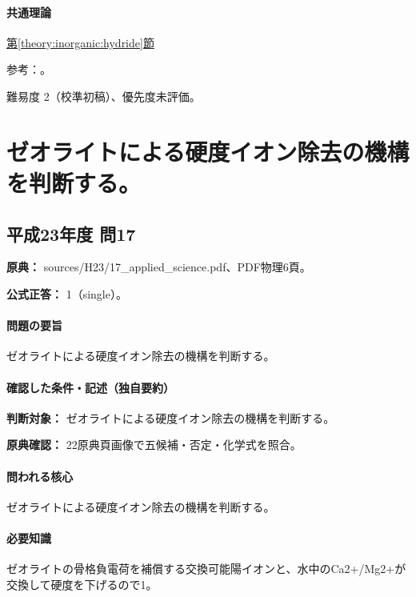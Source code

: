 \paragraph{共通理論} \hyperref[theory:inorganic:hydride]{第\ref*{theory:inorganic:hydride}節}

\par 参考：\cite{inorganic_hydrogen_ref,inorganic_metalloid_ref}。

\par 難易度 2（校準初稿）、優先度未評価。

\section{ゼオライトによる硬度イオン除去の機構を判断する。}

\subsection{平成23年度 問17}
\label{q:h23-reg-applied-17}

\noindent\textbf{原典：} sources/H23/17\_applied\_science.pdf、PDF物理6頁。

\textbf{公式正答：} 1（single）。

\paragraph{問題の要旨} ゼオライトによる硬度イオン除去の機構を判断する。

\paragraph{確認した条件・記述（独自要約）}\mbox{}\par

\noindent\textbf{判断対象：} ゼオライトによる硬度イオン除去の機構を判断する。\par

\noindent\textbf{原典確認：} 22原典頁画像で五候補・否定・化学式を照合。\par

\paragraph{問われる核心} ゼオライトによる硬度イオン除去の機構を判断する。

\paragraph{必要知識} ゼオライトの骨格負電荷を補償する交換可能陽イオンと、水中のCa2+/Mg2+が交換して硬度を下げるので1。

